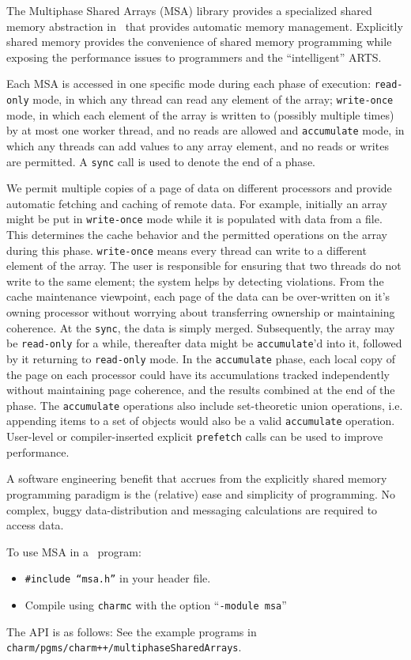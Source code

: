 
The Multiphase Shared Arrays (MSA) library provides a specialized
shared memory abstraction in \charmpp\ that provides automatic memory management.
Explicitly shared memory
provides the convenience of shared memory programming while exposing
the performance issues to programmers and the ``intelligent'' ARTS.

\newcommand{\accu}{\texttt{accumulate}\xspace }
\newcommand{\wo}{\texttt{write-once}\xspace }
\newcommand{\ro}{\texttt{read-only}\xspace }
\newcommand{\sync}{\texttt{sync}\xspace }
\newcommand{\pref}{\texttt{prefetch}\xspace }

Each MSA is accessed in one specific mode
during each phase of execution:
\ro mode, in which any thread can read
any element of the array;
\wo mode, in
which each element of the array is written to (possibly multiple
times) by at most one worker thread, and no reads are allowed
and \accu mode, in which any threads can add values to any array
element, and no reads or writes are permitted.
A \sync call is used to denote the end of a phase.

We permit multiple copies of a page of data on different
processors and provide automatic fetching and caching of remote data.
For example, initially an array might be put in
\wo mode while it is populated with data from a file.
This determines the cache
behavior and the
permitted operations on the array during this phase.
\wo means every thread can write to a different element of the array.
The user is responsible for ensuring that two threads do not write to
the same element; the system helps by detecting violations.
From the cache maintenance viewpoint, each
page of the data can be over-written on it's owning processor without
worrying about transferring ownership or maintaining coherence.
At the \sync, the data is simply merged.
Subsequently, the array may be \ro for a while, thereafter data
might be \accu'd into it, followed by it returning to \ro mode.  In
the \accu phase, each local copy of the page on each processor could
have its accumulations tracked independently without maintaining page
coherence, and the results combined at the end of the phase.
The \accu operations also include set-theoretic union
operations, i.e. appending items to a set of objects would also be a
valid \accu operation.
User-level or compiler-inserted explicit \pref calls can be used to
improve performance.

A software engineering benefit that accrues from the explicitly shared
memory programming paradigm is the (relative) ease and simplicity of
programming.  No complex, buggy data-distribution and messaging
calculations are required to access data.

To use MSA in a \charmpp\ program:
\begin{itemize}
\item \texttt{\#include ``msa.h''} in your header file.
\item Compile using \texttt{charmc} with the option ``\texttt{-module
      msa}''
\end{itemize}

The API is as follows: See the example programs in
\texttt{charm/pgms/charm++/multiphaseSharedArrays}.
